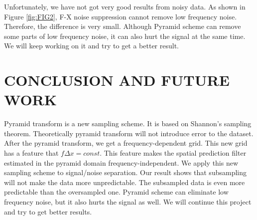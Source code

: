 \par
Unfortunately, we have not got very good results from noisy data. As shown in 
Figure \ref{fig:FIG2}, F-X noise suppression cannot remove low frequency noise. 
Therefore, the difference is very small. Although Pyramid scheme can remove 
some parts of low frequency noise, it can also hurt the signal at the same 
time. We will keep working on it and try to get a better result.

\section{CONCLUSION AND FUTURE WORK}
\par
Pyramid transform is a new sampling scheme. It is based on Shannon's sampling 
theorem. Theoretically pyramid transform will not introduce error to the 
dataset. After the pyramid transform, we get a frequency-dependent grid. This
 new grid has a feature that $f\Delta x = const$. This feature 
makes the spatial prediction filter estimated in the pyramid domain 
frequency-independent. We apply this new sampling scheme to signal/noise 
separation. Our result shows that subsampling will not make the data more 
unpredictable. The subsampled data is even more predictable than the 
oversampled one. Pyramid scheme can eliminate low frequency noise, but it 
also hurts the signal as well. We will continue this project and try to get 
better results.
  



